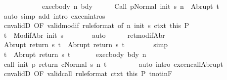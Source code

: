 \begin{isabellebody}
\ \ \ \ \isamarkupfalse%
\ \isanewline
\ \ \ \ \isamarkupfalse%
\ exec{\isacharunderscore}body\ n\ bdy\isanewline
\ \ \ \ \isamarkupfalse%
\ {\isachardoublequoteopen}{\isasymGamma}{\isasymturnstile}{\isasymlangle}Call\ p{\isacharcomma}Normal\ {\isacharparenleft}init\ s{\isacharparenright}{\isasymrangle}\ {\isacharequal}n\ {\isasymRightarrow}\ Abrupt\ t{\isacharprime}{\isachardoublequoteclose}\isanewline
\ \ \ \ \ \ \isamarkupfalse%
\ {\isacharparenleft}auto\ simp\ add{\isacharcolon}\ intro{\isacharcolon}\ execn{\isachardot}intros{\isacharparenright}\isanewline
\ \ \ \ \isamarkupfalse%
\ cnvalidD\ {\isacharbrackleft}OF\ valid{\isacharunderscore}modif\ {\isacharbrackleft}rule{\isacharunderscore}format{\isacharcomma}\ of\ n\ {\isachardoublequoteopen}init\ s{\isachardoublequoteclose}{\isacharbrackright}\ ctxt\ this{\isacharbrackright}\ P\isanewline
\ \ \ \ \isamarkupfalse%
\ {\isachardoublequoteopen}t{\isacharprime}\ {\isasymin}\ ModifAbr\ {\isacharparenleft}init\ s{\isacharparenright}{\isachardoublequoteclose}\isanewline
\ \ \ \ \ \ \isamarkupfalse%
\ auto\isanewline
\ \ \ \ \isamarkupfalse%
\ ret{\isacharunderscore}modifAbr\ \isamarkupfalse%
\ {\isachardoublequoteopen}Abrupt\ {\isacharparenleft}return\ s\ t{\isacharprime}{\isacharparenright}\ {\isacharequal}\ Abrupt\ {\isacharparenleft}return{\isacharprime}\ s\ t{\isacharprime}{\isacharparenright}{\isachardoublequoteclose}\isanewline
\ \ \ \ \ \ \isamarkupfalse%
\ simp\isanewline
\ \ \ \ \isamarkupfalse%
\ \isamarkupfalse%
\ {\isachardoublequoteopen}t\ {\isacharequal}\ Abrupt\ {\isacharparenleft}return{\isacharprime}\ s\ t{\isacharprime}{\isacharparenright}{\isachardoublequoteclose}\ \isacommand{{\isachardot}}\isamarkupfalse%
\isanewline
\ \ \ \ \isamarkupfalse%
\ exec{\isacharunderscore}body\ bdy\ n\isanewline
\ \ \ \ \isamarkupfalse%
\ {\isachardoublequoteopen}{\isasymGamma}{\isasymturnstile}{\isasymlangle}call\ init\ p\ return{\isacharprime}\ c{\isacharcomma}Normal\ s{\isasymrangle}\ {\isacharequal}n{\isasymRightarrow}\ t{\isachardoublequoteclose}\ \isanewline
\ \ \ \ \ \ \isamarkupfalse%
\ {\isacharparenleft}auto\ intro{\isacharcolon}\ execn{\isacharunderscore}callAbrupt{\isacharparenright}\isanewline
\ \ \ \ \isamarkupfalse%
\ cnvalidD\ {\isacharbrackleft}OF\ valid{\isacharunderscore}call\ {\isacharbrackleft}rule{\isacharunderscore}format{\isacharbrackright}\ ctxt\ this{\isacharbrackright}\ P\ t{\isacharunderscore}notin{\isacharunderscore}F\isanewline

\end{isabellebody}
